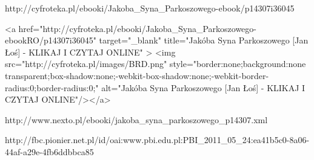 http://cyfroteka.pl/ebooki/Jakoba_Syna_Parkoszowego-ebook/p14307i36045

<a href="http://cyfroteka.pl/ebooki/Jakoba_Syna_Parkoszowego-ebookRO/p14307i36045" target="_blank" title="Jakóba Syna Parkoszowego [Jan Łoś]  - KLIKAJ I CZYTAJ ONLINE" > <img src="http://cyfroteka.pl/images/BRD.png" style="border:none;background:none transparent;box-shadow:none;-webkit-box-shadow:none;-webkit-border-radius:0;border-radius:0;" alt="Jakóba Syna Parkoszowego [Jan Łoś]  - KLIKAJ I CZYTAJ ONLINE"/></a>

http://www.nexto.pl/ebooki/jakoba_syna_parkoszowego_p14307.xml

http://fbc.pionier.net.pl/id/oai:www.pbi.edu.pl:PBI_2011_05_24:ea41b5c0-8a06-44af-a29e-4fb6ddbbca85

